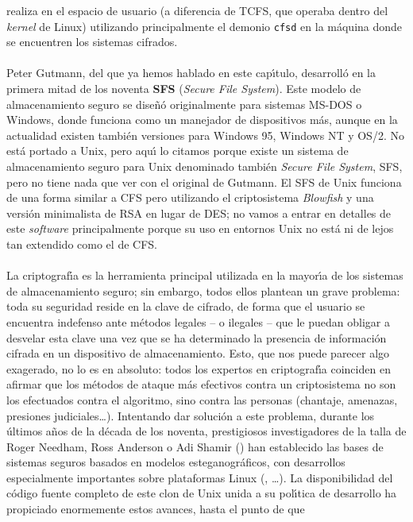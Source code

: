 realiza en el espacio de usuario (a diferencia de TCFS, que operaba dentro del
{\it kernel} de Linux) utilizando principalmente el demonio {\tt cfsd} en 
la m\'aquina donde se encuentren los sistemas cifrados.\\
\\Peter Gutmann, del que ya hemos hablado en este cap\'{\i}tulo, desarroll\'o
en la primera mitad de los noventa {\bf SFS} ({\it Secure File System}). Este
modelo de almacenamiento seguro se dise\~n\'o originalmente para sistemas 
MS-DOS o Windows, donde funciona como un manejador de dispositivos m\'as, aunque
en la actualidad existen tambi\'en versiones para Windows 95, Windows NT y OS/2.
No est\'a portado a Unix, pero aqu\'{\i} lo citamos porque existe un sistema de 
almacenamiento seguro para Unix denominado tambi\'en {\it Secure File System}, 
SFS, pero no tiene nada que ver con el original de Gutmann. El SFS de Unix 
funciona de una forma similar a CFS pero utilizando el criptosistema {\it 
Blowfish} y una versi\'on minimalista de RSA en lugar de DES; no vamos a entrar
en detalles de este {\it software} principalmente porque su uso en entornos 
Unix no est\'a ni de lejos tan extendido como el de CFS.\\
\\La criptograf\'{\i}a es la herramienta principal utilizada en la mayor\'{\i}a
de los sistemas de almacenamiento seguro; sin embargo, todos ellos plantean un 
grave problema: toda su seguridad reside en la clave de cifrado, de forma que el
usuario se encuentra indefenso ante m\'etodos legales -- o ilegales -- que le
puedan obligar a desvelar esta clave una vez que se ha determinado la presencia
de informaci\'on cifrada en un dispositivo de almacenamiento. Esto, que nos
puede parecer algo exagerado, no lo es en absoluto: todos los expertos en
criptograf\'{\i}a coinciden en afirmar que los m\'etodos de ataque m\'as 
efectivos contra un criptosistema no son los efectuados contra el algoritmo,
sino contra las personas (chantaje, amenazas, presiones judiciales\ldots).
Intentando dar soluci\'on a este problema, durante los \'ultimos a\~nos de
la d\'ecada de los noventa, prestigiosos investigadores de la talla de Roger
Needham, Ross Anderson o Adi Shamir (\cite{kn:ans98}) han establecido las bases 
de sistemas seguros basados en modelos esteganogr\'aficos, con desarrollos 
especialmente importantes sobre plataformas Linux (\cite{kn:steg99}, 
\cite{kn:ss98}\ldots). La disponibilidad
del c\'odigo fuente completo de este clon de Unix unida a su pol\'{\i}tica de
desarrollo ha propiciado enormemente estos avances, hasta el punto de que
